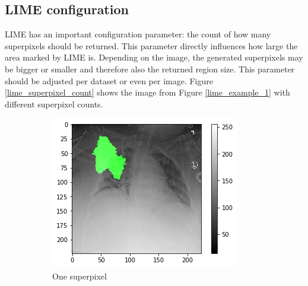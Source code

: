 \clearpage
\subsection{LIME configuration}
LIME has an important configuration parameter: the count of how many superpixels should be returned. This parameter directly influences how large the area marked by LIME is. Depending on the image, the generated superpixels may be bigger or smaller and therefore also the returned region size. This parameter should be adjusted per dataset or even per image. Figure \ref{lime_superpixel_count} shows the image from Figure \ref{lime_example_1} with different superpixel counts.

\begin{figure}[H]
    \centering
    \begin{subfigure}[b]{.4\textwidth}
        \centering
        \includegraphics[width=\linewidth]{chapters/03_classification/images/lime_sp_1.png}
        \caption{One superpixel}
    \end{subfigure}\hspace{1cm}%
    \begin{subfigure}[b]{.4\textwidth}
        \centering

\end{subfigure}
\end{figure}

